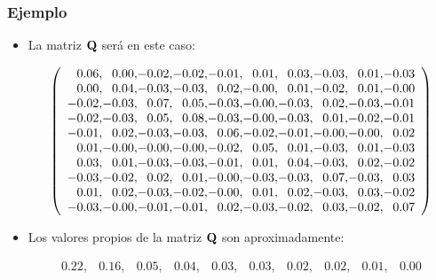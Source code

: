 \begin{frame}
\frametitle{Ejemplo}
\begin{itemize}
\item<2->{La matriz $\mathbf{Q}$ será en este caso:
{\tiny 
\begin{center}
$$\left(
\begin{array}{r@{}r@{}r@{}r@{}r@{}r@{}r@{}r@{}r@{}r}
0.06,  &  0.00,  &  -0.02,  &  -0.02,  &  -0.01,  &  0.01,  &  0.03,  &  -0.03,  &  0.01,  &  -0.03 \\
0.00,  &  0.04,  &  -0.03,  &  -0.03,  &  0.02,  &  -0.00,  &  0.01,  &  -0.02,  &  0.01,  &  -0.00 \\
-0.02,  &  -0.03,  &  0.07,  &  0.05,  &  -0.03,  &  -0.00,  &  -0.03,  &  0.02,  &  -0.03,  &  -0.01 \\
-0.02,  &  -0.03,  &  0.05,  &  0.08,  &  -0.03,  &  -0.00,  &  -0.03,  &  0.01,  &  -0.02,  &  -0.01 \\
-0.01,  &  0.02,  &  -0.03,  &  -0.03,  &  0.06,  &  -0.02,  &  -0.01,  &  -0.00,  &  -0.00,  &  0.02 \\
0.01,  &  -0.00,  &  -0.00,  &  -0.00,  &  -0.02,  &  0.05,  &  0.01,  &  -0.03,  &  0.01,  &  -0.03 \\
0.03,  &  0.01,  &  -0.03,  &  -0.03,  &  -0.01,  &  0.01,  &  0.04,  &  -0.03,  &  0.02,  &  -0.02 \\
-0.03,  &  -0.02,  &  0.02,  &  0.01,  &  -0.00,  &  -0.03,  &  -0.03,  &  0.07,  &  -0.03,  &  0.03 \\
0.01,  &  0.02,  &  -0.03,  &  -0.02,  &  -0.00,  &  0.01,  &  0.02,  &  -0.03,  &  0.03,  &  -0.02 \\
-0.03,  &  -0.00,  &  -0.01,  &  -0.01,  &  0.02,  &  -0.03,  &  -0.02,  &  0.03,  &  -0.02,  &  0.07 \\
\end{array}\right)$$
\end{center}}}
\item<3->{Los valores propios de la matriz $\mathbf{Q}$ son aproximadamente:
{\tiny\begin{center}
$$
\begin{array}{rrrrrrrrrr}
0.22,  &  0.16,  &  0.05,  &  0.04,  &  0.03,  &  0.03,  &  0.02,  &  0.02,  &  0.01,  &  0.00 \\
\end{array}
$$
\end{center}}}
\end{itemize}
\end{frame}

